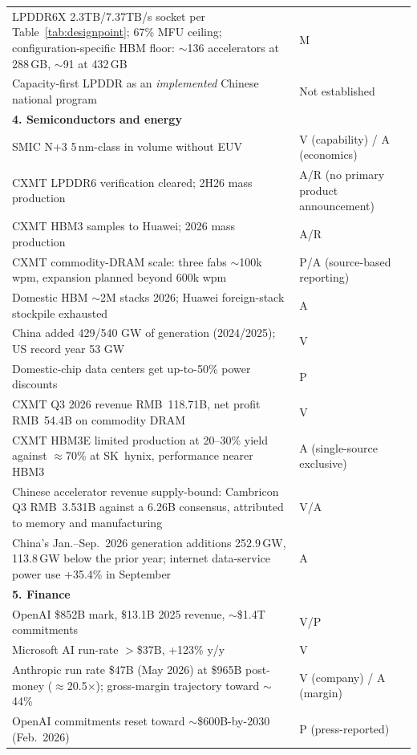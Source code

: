 \begin{small}
\begin{longtable}{p{100mm}p{36mm}}
  LPDDR6X 2.3TB/7.37TB/s socket per Table~\ref{tab:designpoint}; 67\% MFU ceiling; configuration-specific HBM floor: $\sim$136 accelerators at 288\,GB, $\sim$91 at 432\,GB & M \\
  Capacity-first LPDDR as an \emph{implemented} Chinese national program & Not established \\
  \midrule
  \multicolumn{2}{l}{\textbf{4. Semiconductors and energy}} \\
  \midrule
  SMIC N+3 5\,nm-class in volume without EUV & V (capability) / A (economics) \\
  CXMT LPDDR6 verification cleared; 2H26 mass production & A/R (no primary product announcement) \\
  CXMT HBM3 samples to Huawei; 2026 mass production & A/R \\
  CXMT commodity-DRAM scale: three fabs $\sim$100k wpm, expansion planned beyond 600k wpm & P/A (source-based reporting) \\
  Domestic HBM $\sim$2M stacks 2026; Huawei foreign-stack stockpile exhausted & A \\
  China added 429/540 GW of generation (2024/2025); US record year 53 GW & V \\
  Domestic-chip data centers get up-to-50\% power discounts & P \\
  \midrule
  CXMT Q3 2026 revenue RMB~118.71B, net profit RMB~54.4B on commodity DRAM & V \\
  CXMT HBM3E limited production at 20--30\% yield against $\approx$70\% at SK~hynix, performance nearer HBM3 & A (single-source exclusive) \\
  Chinese accelerator revenue supply-bound: Cambricon Q3 RMB~3.531B against a 6.26B consensus, attributed to memory and manufacturing & V/A \\
  China's Jan.--Sep.\ 2026 generation additions 252.9\,GW, 113.8\,GW below the prior year; internet data-service power use +35.4\% in September & A \\
  \midrule
  \multicolumn{2}{l}{\textbf{5. Finance}} \\
  \midrule
  OpenAI \$852B mark, \$13.1B 2025 revenue, $\sim$\$1.4T commitments & V/P \\
  Microsoft AI run-rate $>$\$37B, +123\% y/y & V \\
  Anthropic run rate \$47B (May 2026) at \$965B post-money ($\approx$20.5$\times$); gross-margin trajectory toward $\sim$44\% & V (company) / A (margin) \\
  OpenAI commitments reset toward $\sim$\$600B-by-2030 (Feb.\ 2026) & P (press-reported) \\

\end{longtable}
\end{small}

